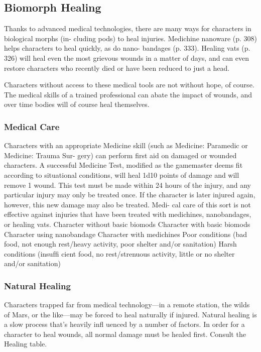 \subsection{Biomorph Healing}

Thanks to advanced medical technologies, there are 
many ways for characters in biological morphs (in-
cluding pods) to heal injuries. Medichine nanoware 
(p. 308) helps characters to heal quickly, as do nano-
bandages (p. 333). Healing vats (p. 326) will heal even 
the most grievous wounds in a matter of days, and 
can even restore characters who recently died or have 
been reduced to just a head.

Characters without access to these medical tools are 
not without hope, of course. The medical skills of a 
trained professional can abate the impact of wounds, 
and over time bodies will of course heal themselves.

\subsubsection{Medical Care}

Characters with an appropriate Medicine skill (such 
as Medicine: Paramedic or Medicine: Trauma Sur-
gery) can perform first aid on damaged or wounded 
characters. A successful Medicine Test, modified as 
the gamemaster deems fit according to situational 
conditions, will heal 1d10 points of damage and will 
remove 1 wound. This test must be made within 24 
hours of the injury, and any particular injury may only 
be treated once. If the character is later injured again, 
however, this new damage may also be treated. Medi-
cal care of this sort is not effective against injuries that 
have been treated with medichines, nanobandages, or 
healing vats.
Character without basic biomods
Character with basic biomods
Character using nanobandage
Character with medichines
Poor conditions (bad food, not enough rest/heavy activity, 
poor shelter and/or sanitation)
Harsh conditions (insufﬁ cient food, no rest/strenuous activity, 
little or no shelter and/or sanitation)

\subsubsection{Natural Healing}

Characters trapped far from medical technology—in 
a remote station, the wilds of Mars, or the like—may 
be forced to heal naturally if injured. Natural healing 
is a slow process that's heavily infl uenced by a number 
of factors. In order for a character to heal wounds, 
all normal damage must be healed first. Consult the 
Healing table.

